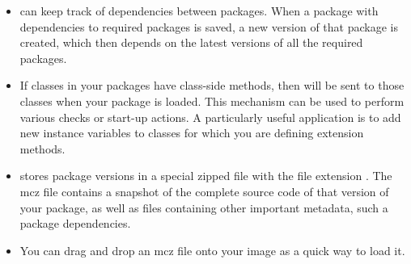 \documentclass[a4paper,10pt,twoside]{book}
\begin{document}
\begin{itemize}
\item \MC can keep track of dependencies between packages. When a package with dependencies to required packages is saved, a new version of that package is created, which then depends on the latest versions of all the required packages.

\item If classes in your packages have class-side  methods, then  will be sent to those classes when your package is loaded. This mechanism can be used to perform various checks or start-up actions. A particularly useful application is to add new instance variables to classes for which you are defining extension methods.

\item \MC stores package versions in a special zipped file with the file extension . The mcz file contains a snapshot of the complete source code of that version of your package, as well as files containing other important metadata, such a package dependencies.

\item You can drag and drop an mcz file onto your image as a quick way to load it.






\end{itemize}

\end{document}

